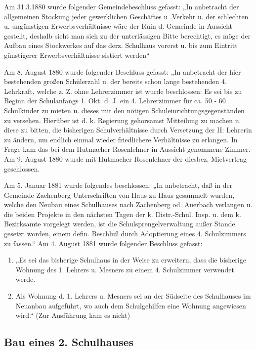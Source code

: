 \documentclass[12pt,a4paper]{book}
\begin{document}
Am 31.3.1880 wurde folgender Gemeindebeschluss gefasst: „In anbetracht
der allgemeinen Stockung jeder gewerklichen Geschäftes u .Verkehr u. der
schlechten u. ungünstigen Erwerbsverhältnisse wäre der Ruin d. Gemeinde
in Aussicht gestellt, deshalb sieht man sich zu der unterlässigen Bitte
berechtigt, es möge der Aufbau eines Stockwerkes auf das derz. Schulhaus
vorerst u. bis zum Eintritt günstigerer Erwerbsverhältnisse sistiert
werden“

Am 8. August 1880 wurde folgender Beschluss gefasst: „In anbetracht der
hier bestehenden großen Schülerzahl u. der bereits schon lange
bestehenden 4. Lehrkraft, welche z. Z. ohne Lehrerzimmer ist wurde
beschlossen: Es sei bis zu Beginn der Schulanfangs 1. Okt. d. J. ein 4.
Lehrerzimmer für ca. 50 - 60 Schulkinder zu mieten u. dieses mit den
nötigen Schuleinrichtungsgegenständen zu versehen. Hierüber ist d. k.
Regierung gehorsamst Mitteilung zu machen u. diese zu bitten, die
bisherigen Schulverhältnisse durch Versetzung der II: Lehrerin zu
ändern, um endlich einmal wieder friedlichere Verhältnisse zu erlangen.
In Frage kam das bei dem Hutmacher Rosenlehner in Aussicht genommene
Zimmer. Am 9. August 1880 wurde mit Hutmacher Rosenlehner der diesbez.
Mietvertrag geschlossen.

Am 5. Januar 1881 wurde folgendes beschlossen: „In anbetracht, daß in
der Gemeinde Zachenberg Unterschriften von Haus zu Haus gesammelt
wurden, welche den Neubau eines Schulhauses nach Zachenberg od. Auerbach
verlangen u. die beiden Projekte in den nächsten Tagen der k.
Distr.-Schul. Insp. u. dem k. Bezirksamte vorgelegt werden, ist die
Schulsprengelverwaltung außer Stande gesetzt worden, einem defin.
Beschluß durch Adoptierung eines 4. Schulzimmers zu fassen.“ Am 4.
August 1881 wurde folgender Beschluss gefasst:

\begin{enumerate}
\item „Es sei das bisherige Schulhaus in der Weise zu erweitern, dass
die bisherige Wohnung des 1. Lehrers u. Mesners zu einem 4. Schulzimmer
verwendet werde.

\item Als Wohnung d. 1. Lehrers u. Mesners sei an der Südseite des
Schulhauses im Neuanbau aufgeführt, wo auch dem Schulgehilfen eine
Wohnung angewiesen wird.“ (Zur Ausführung kam es nicht)
\end{enumerate}

\subsection[Bau eines 2. Schulhauses]{Bau eines 2.
Schulhauses\protect\footnotemark{}\protect{}}
\end{document}
